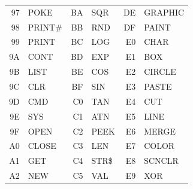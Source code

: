 {\begin{tabular}{|rp{2.2cm}|rp{2.2cm}|rp{2.2cm}|}
  97 & POKE       &  BA & SQR        &  DE & GRAPHIC    \\
  98 & PRINT\#    &  BB & RND        &  DF & PAINT      \\
  99 & PRINT      &  BC & LOG        &  E0 & CHAR       \\
  9A & CONT       &  BD & EXP        &  E1 & BOX        \\
  9B & LIST       &  BE & COS        &  E2 & CIRCLE     \\
  9C & CLR        &  BF & SIN        &  E3 & PASTE      \\
  9D & CMD        &  C0 & TAN        &  E4 & CUT        \\
  9E & SYS        &  C1 & ATN        &  E5 & LINE       \\
  9F & OPEN       &  C2 & PEEK       &  E6 & MERGE      \\
  A0 & CLOSE      &  C3 & LEN        &  E7 & COLOR      \\
  A1 & GET        &  C4 & STR\$      &  E8 & SCNCLR     \\
  A2 & NEW        &  C5 & VAL        &  E9 & XOR        \\
\hline
\end{tabular}}
\newpage
